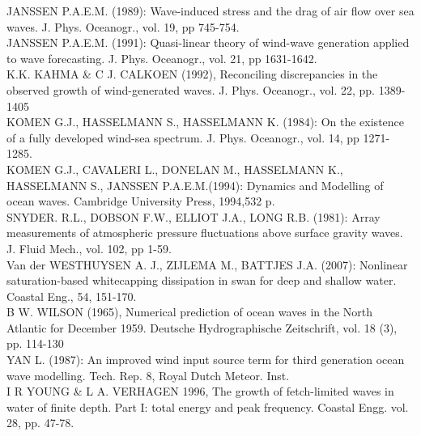 \documentclass[10pt]{article}
\begin{document}
JANSSEN P.A.E.M. (1989): Wave-induced stress and the drag of air flow over
sea waves. J. Phys. Oceanogr., vol. 19, pp 745-754.\\
JANSSEN P.A.E.M. (1991): Quasi-linear theory of wind-wave generation applied
to wave forecasting. J. Phys. Oceanogr., vol. 21, pp 1631-1642.\\
K.K. KAHMA \& C J. CALKOEN (1992), Reconciling discrepancies in the observed
growth of wind-generated waves. J. Phys. Oceanogr., vol. 22, pp. 1389-1405\\
KOMEN G.J., HASSELMANN S., HASSELMANN K. (1984): On the existence of a fully
developed wind-sea spectrum. J. Phys. Oceanogr., vol. 14, pp 1271-1285.\\
KOMEN G.J., CAVALERI L., DONELAN M., HASSELMANN K., HASSELMANN S., JANSSEN
P.A.E.M.(1994): Dynamics and Modelling of ocean waves. Cambridge University
Press, 1994,532 p.\\
SNYDER. R.L., DOBSON F.W., ELLIOT J.A., LONG R.B. (1981): Array measurements of
atmospheric pressure fluctuations above surface gravity waves. J. Fluid Mech.,
vol. 102, pp 1-59.\\
Van der WESTHUYSEN A. J., ZIJLEMA M., BATTJES J.A. (2007): Nonlinear
saturation-based whitecapping dissipation in swan for deep and shallow water.
Coastal Eng., 54, 151-170.\\
B W. WILSON (1965), Numerical prediction of ocean waves in the North Atlantic
for December 1959. Deutsche Hydrographische Zeitschrift, vol. 18 (3), pp.
114-130\\
YAN L. (1987): An improved wind input source term for third generation ocean
wave modelling. Tech. Rep. 8, Royal Dutch Meteor. Inst.\\
I R YOUNG \& L A. VERHAGEN 1996, The growth of fetch-limited waves in water of
finite depth. Part I: total energy and peak frequency. Coastal Engg. vol. 28,
pp. 47-78.\\
\end{document}
